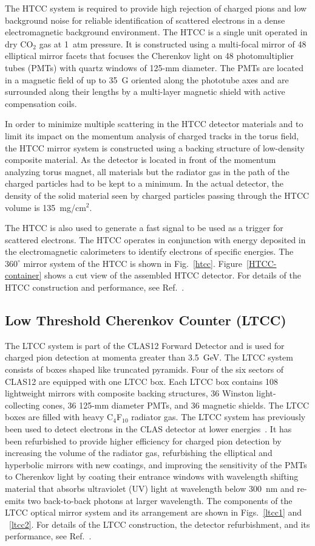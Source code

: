 \documentclass[final,3p,twocolumn]{elsarticle}
\begin{document}
The HTCC system is required to provide high rejection of charged pions and low background noise for reliable 
identification of scattered electrons in a dense electromagnetic background environment. The HTCC is a single unit
operated in dry CO$_2$ gas at 1~atm pressure. It is constructed using a multi-focal mirror of 48 elliptical mirror
facets that focuses the Cherenkov light on 48 photomultiplier tubes (PMTs) with quartz windows of 125-mm diameter.
The PMTs are located in a magnetic field of up to 35~G oriented along the phototube axes and are surrounded along
their lengths by a multi-layer magnetic shield with active compensation coils.

In order to minimize multiple scattering in the HTCC detector materials and to limit its impact on the momentum
analysis of charged tracks in the torus field, the HTCC mirror system is constructed using a backing structure of
low-density composite material. As the detector is located in front of the momentum analyzing torus magnet, all
materials but the radiator gas in the path of the charged particles had to be kept to a minimum. In the actual
detector, the density of the solid material seen by charged particles passing through the HTCC volume is
135~mg/cm$^2$. 

The HTCC is also used to generate a fast signal to be used as a trigger for scattered electrons. The HTCC operates
in conjunction with energy deposited in the electromagnetic calorimeters to identify electrons of specific energies.
The $360^\circ$ mirror system of the HTCC is shown in Fig.~\ref{htcc}. Figure~\ref{HTCC-container} shows a cut
view of the assembled HTCC detector. For details of the HTCC construction and performance, see Ref.~\cite{HTCC}.   

\subsection{Low Threshold Cherenkov Counter (LTCC)}

The LTCC system is part of the CLAS12  Forward Detector and is used for charged pion detection at momenta
greater than 3.5~GeV. The LTCC system consists of boxes shaped like truncated pyramids. Four of the six sectors
of CLAS12 are equipped with one LTCC box. Each LTCC box contains 108 lightweight mirrors with composite
backing structures, 36 Winston light-collecting cones, 36 125-mm diameter PMTs, and 36 magnetic shields. The
LTCC boxes are filled with heavy C$_4$F$_{10}$ radiator gas. The LTCC system has previously been used to
detect electrons in the CLAS detector at lower energies~\cite{Adams:2001kk}. It has been refurbished to provide
higher efficiency for charged pion detection by increasing the volume of the radiator gas, refurbishing the elliptical
and hyperbolic mirrors with new coatings, and improving the sensitivity of the PMTs to Cherenkov light by coating
their entrance windows with wavelength shifting material that absorbs ultraviolet (UV) light at wavelength below
300~nm and re-emits two back-to-back photons at larger wavelength. The components of the LTCC optical mirror
system and its arrangement are shown in Figs.~\ref{ltcc1} and ~\ref{ltcc2}. For details of the LTCC construction,
the detector refurbishment, and its performance, see Ref.~\cite{LTCC}.   
\end{document}
